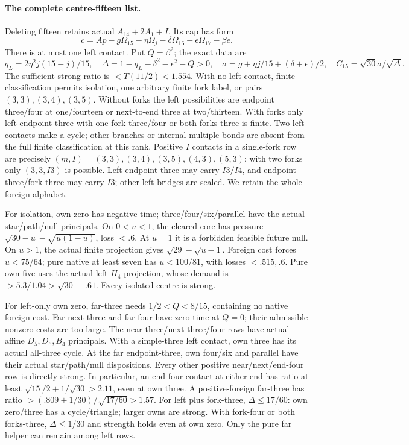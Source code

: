 \documentclass[11pt]{article}
\theoremstyle{definition}
\theoremstyle{remark}
\begin{document}
\paragraph{The complete centre-fifteen list.}
Deleting fifteen retains actual \(A_{14}+2A_1+I\). Its cap has form
\[
 c=Ap-g\Omega_{15}-\eta\Omega_j-\delta\Omega_{16}
                       -\epsilon\Omega_{17}-\beta e.
\]
There is at most one left contact. Put \(Q=\beta^2\); the exact data are
\[
 q_L=2\eta^2j(15-j)/15,\quad
 \Delta=1-q_L-\delta^2-\epsilon^2-Q>0,\quad
 \sigma=g+\eta j/15+(\delta+\epsilon)/2,\quad
 C_{15}=\sqrt{30}\sigma/\sqrt\Delta.
\]
The sufficient strong ratio is \(<T(11/2)<1.554\).
With no left contact, finite classification permits isolation, one
arbitrary finite fork label, or pairs \((3,3),(3,4),(3,5)\).
Without forks the left possibilities are endpoint three/four at
one/fourteen or next-to-end three at two/thirteen. With forks only
left endpoint-three with one fork-three/four or both forks-three
is finite. Two left contacts make a cycle; other branches or internal
multiple bonds are absent from the full finite classification at this rank.
Positive \(I\) contacts in a single-fork row are precisely
\((m,I)=(3,3),(3,4),(3,5),(4,3),(5,3)\); with two forks only
\((3,3,I3)\) is possible. Left endpoint-three may carry \(I3/I4\),
and endpoint-three/fork-three may carry \(I3\); other left bridges
are sealed. We retain the whole foreign alphabet.

For isolation, own zero has negative time; three/four/six/parallel
have the actual star/path/null principals. On \(0<u<1\), the cleared
core has pressure \(\sqrt{30-u}-\sqrt{u(1-u)}\), loss \(<.6\).
At \(u=1\) it is a forbidden feasible future null. On \(u>1\),
the actual finite projection gives \(\sqrt{29}-\sqrt{u-1}\).
Foreign cost forces \(u<75/64\); pure native at least seven has
\(u<100/81\), with losses \(<.515,.6\). Pure own five uses the
actual left-\(H_4\) projection, whose demand is
\(>5.3/1.04>\sqrt{30}-.61\). Every isolated centre is strong.

For left-only own zero, far-three needs \(1/2<Q<8/15\), containing
no native foreign cost. Far-next-three and far-four have zero time
at \(Q=0\); their admissible nonzero costs are too large. The near
three/next-three/four rows have actual affine \(D_5,D_6,B_4\)
principals. With a simple-three left contact, own three has its
actual all-three cycle. At the far endpoint-three, own four/six
and parallel have their actual star/path/null dispositions.
Every other positive near/next/end-four row is directly strong.
In particular, an end-four contact at either end has ratio at least
\(\sqrt{15}/2+1/\sqrt{30}>2.11\), even at own three.
A positive-foreign far-three has ratio
\(>(.809+1/30)/\sqrt{17/60}>1.57\).
For left plus fork-three, \(\Delta\le17/60\): own zero/three has
a cycle/triangle; larger owns are strong. With fork-four or both
forks-three, \(\Delta\le1/30\) and strength holds even at own zero.
Only the pure far helper can remain among left rows.
\end{document}
